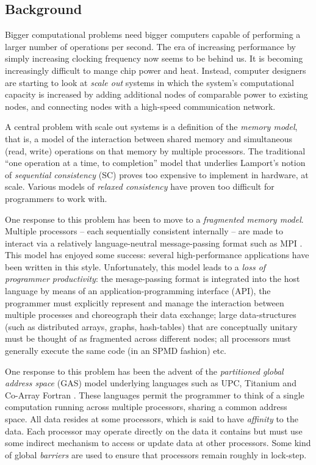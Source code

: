 \subsection*{Background}
Bigger computational problems need bigger computers capable of
performing a larger number of operations per second. The era of
increasing performance by simply increasing clocking frequency now
seems to be behind us. It is becoming increasingly difficult
to mange chip power and heat.  Instead, computer
designers are starting to look at {\em scale out} systems in which the
system's computational capacity is increased by adding additional
nodes of comparable power to existing nodes, and connecting nodes with
a high-speed communication network.

A central problem with scale out systems is a definition of the {\em
memory model}, that is, a model of the interaction between shared
memory and  simultaneous (read, write) operations on that
memory by multiple processors. The traditional ``one operation at a
time, to completion'' model that underlies Lamport's notion of {\em
sequential consistency} (SC) proves too expensive to implement in
hardware, at scale. Various models of {\em relaxed consistency} have
proven too difficult for programmers to work with.  

One response to this problem has been to move to a {\em fragmented
memory model}. Multiple processors -- each sequentially consistent
internally -- are made to interact via a relatively language-neutral
message-passing format such as MPI \cite{mpi}. This model has enjoyed
some success: several high-performance applications have been written
in this style. Unfortunately, this model leads to a {\em loss of
programmer productivity}: the mesage-passing format is integrated into
the host language by means of an application-programming interface
(API), the programmer must explicitly represent and manage the
interaction between multiple processes and choreograph their data
exchange; large data-structures (such as distributed arrays, graphs,
hash-tables) that are conceptually unitary must be thought of as
fragmented across different nodes; all processors must generally
execute the same code (in an SPMD fashion) etc.

One response to this problem has been the advent of the {\em
partitioned global address space} (GAS) model underlying languages
such as UPC, Titanium and Co-Array Fortran \cite{pgas,titanium}. These
languages permit the programmer to think of a single computation
running across multiple processors, sharing a common address
space. All data resides at some processors, which is said to have {\em
affinity} to the data.  Each processor may operate directly on the
data it contains but must use some indirect mechanism to access or
update data at other processors. Some kind of global {\em barriers}
are used to ensure that processors remain roughly in lock-step.

